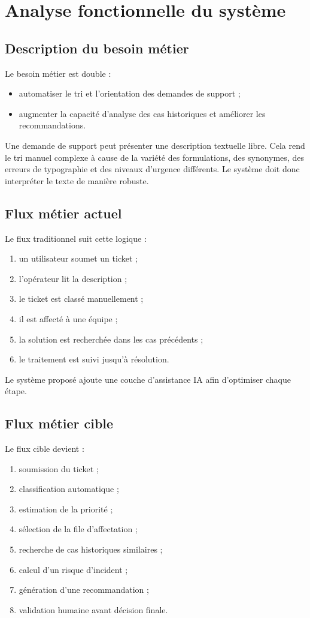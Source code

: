 \documentclass[11pt,a4paper]{report}
\begin{document}
\chapter{Analyse fonctionnelle du système}
\section{Description du besoin métier}
Le besoin métier est double :
\begin{itemize}[leftmargin=1.3em]
    \item automatiser le tri et l’orientation des demandes de support ;
    \item augmenter la capacité d’analyse des cas historiques et améliorer les recommandations.
\end{itemize}
Une demande de support peut présenter une description textuelle libre. Cela rend le tri manuel complexe à cause de la variété des formulations, des synonymes, des erreurs de typographie et des niveaux d’urgence différents. Le système doit donc interpréter le texte de manière robuste.

\section{Flux métier actuel}
Le flux traditionnel suit cette logique :
\begin{enumerate}[leftmargin=1.8em]
    \item un utilisateur soumet un ticket ;
    \item l’opérateur lit la description ;
    \item le ticket est classé manuellement ;
    \item il est affecté à une équipe ;
    \item la solution est recherchée dans les cas précédents ;
    \item le traitement est suivi jusqu’à résolution.
\end{enumerate}
Le système proposé ajoute une couche d’assistance IA afin d’optimiser chaque étape.

\section{Flux métier cible}
Le flux cible devient :
\begin{enumerate}[leftmargin=1.8em]
    \item soumission du ticket ;
    \item classification automatique ;
    \item estimation de la priorité ;
    \item sélection de la file d’affectation ;
    \item recherche de cas historiques similaires ;
    \item calcul d’un risque d’incident ;
    \item génération d’une recommandation ;
    \item validation humaine avant décision finale.
\end{enumerate}
\end{document}

